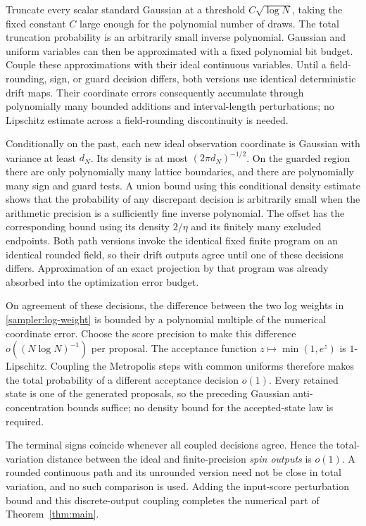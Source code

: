 \documentclass[11pt,reqno]{amsart}
\begin{document}
Truncate every scalar standard Gaussian at a threshold $C\sqrt{\log N}$, taking the fixed constant $C$ large enough for the polynomial number of draws. The total truncation probability is an arbitrarily small inverse polynomial. Gaussian and uniform variables can then be approximated with a fixed polynomial bit budget. Couple these approximations with their ideal continuous variables. Until a field-rounding, sign, or guard decision differs, both versions use identical deterministic drift maps. Their coordinate errors consequently accumulate through polynomially many bounded additions and interval-length perturbations; no Lipschitz estimate across a field-rounding discontinuity is needed.

Conditionally on the past, each new ideal observation coordinate is Gaussian with variance at least $d_N$. Its density is at most $(2\pi d_N)^{-1/2}$. On the guarded region there are only polynomially many lattice boundaries, and there are polynomially many sign and guard tests. A union bound using this conditional density estimate shows that the probability of any discrepant decision is arbitrarily small when the arithmetic precision is a sufficiently fine inverse polynomial. The offset has the corresponding bound using its density $2/\eta$ and its finitely many excluded endpoints. Both path versions invoke the identical fixed finite program on an identical rounded field, so their drift outputs agree until one of these decisions differs. Approximation of an exact projection by that program was already absorbed into the optimization error budget.

On agreement of these decisions, the difference between the two log weights in \eqref{sampler:log-weight} is bounded by a polynomial multiple of the numerical coordinate error. Choose the score precision to make this difference $o((N\log N)^{-1})$ per proposal. The acceptance function $z\mapsto\min(1,e^z)$ is $1$-Lipschitz. Coupling the Metropolis steps with common uniforms therefore makes the total probability of a different acceptance decision $o(1)$. Every retained state is one of the generated proposals, so the preceding Gaussian anti-concentration bounds suffice; no density bound for the accepted-state law is required.

The terminal signs coincide whenever all coupled decisions agree. Hence the total-variation distance between the ideal and finite-precision \emph{spin outputs} is $o(1)$. A rounded continuous path and its unrounded version need not be close in total variation, and no such comparison is used. Adding the input-score perturbation bound and this discrete-output coupling completes the numerical part of Theorem~\ref{thm:main}.




\end{document}
